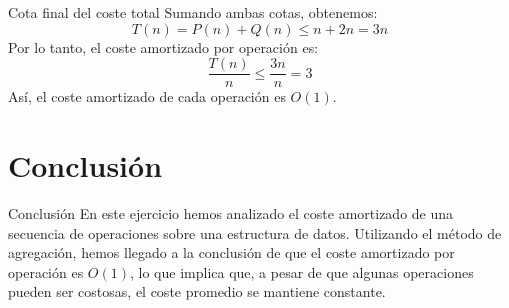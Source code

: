 \documentclass[aspectratio=169]{beamer}
\begin{document}
\begin{frame}{Cota final del coste total}
    Sumando ambas cotas, obtenemos:
    \[
    T(n) = P(n) + Q(n) \leq n + 2n = 3n
    \]
    Por lo tanto, el coste amortizado por operación es:
    \[
    \frac{T(n)}{n} \leq \frac{3n}{n} = 3
    \]
    Así, el coste amortizado de cada operación es $O(1)$.
\end{frame}

\section{Conclusión}
\begin{frame}{Conclusión}
    En este ejercicio hemos analizado el coste amortizado de una secuencia de operaciones sobre una estructura de datos. Utilizando el método de agregación, hemos llegado a la conclusión de que el coste amortizado por operación es $O(1)$, lo que implica que, a pesar de que algunas operaciones pueden ser costosas, el coste promedio se mantiene constante.
\end{frame}
\end{document}
